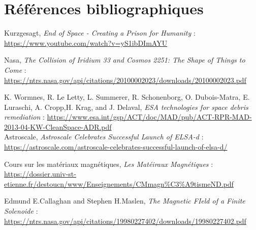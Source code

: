 \documentclass[a4paper,1pt]{article}
\begin{document}
\section{Références bibliographiques}
\begin{thebibliography}{11}
	Kurzgesagt, \textit{End of Space - Creating a Prison for Humanity} :
	\url{https://www.youtube.com/watch?v=yS1ibDImAYU}

    Nasa, \textit{The Collision of Iridium 33 and Cosmos 2251: The Shape of Things to Come} : \url{https://ntrs.nasa.gov/api/citations/20100002023/downloads/20100002023.pdf}

K. Wormnes, R. Le Letty, L. Summerer, R. Schonenborg, O. Dubois-Matra, E. Luraschi, A. Cropp,H. Krag, and J. Delaval, \textit{ESA technologies for space debris remediation} :
	\url{https://www.esa.int/gsp/ACT/doc/MAD/pub/ACT-RPR-MAD-2013-04-KW-CleanSpace-ADR.pdf}\\

Astroscale, \textit{Astroscale Celebrates Successful Launch of ELSA-d} : \url{https://astroscale.com/astroscale-celebrates-successful-launch-of-elsa-d/}

Cours sur les matériaux magnétiques, \textit{Les Matéiraux Magnétiques} : \url{https://dossier.univ-st-etienne.fr/destoucn/www/Enseignements/CMmagn%C3%A9tismeND.pdf}

Edmund E.Callaghan and Stephen H.Maslen, \textit{The Magnetic FIeld of a Finite Solenoide} : \url{https://ntrs.nasa.gov/api/citations/19980227402/downloads/19980227402.pdf}
\end{thebibliography}
\end{document}
